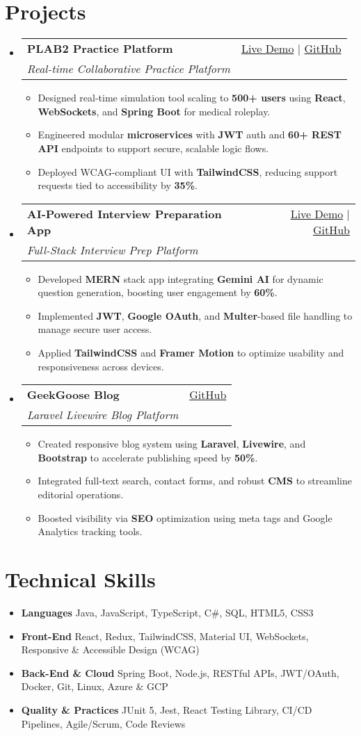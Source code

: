 \documentclass[letterpaper,11pt]{article}
\makeatletter
\newcommand{\resumeItem}[1]{\item\small{#1 \vspace{-2pt}}}
\newcommand{\resumeSubheading}[4]{
  \vspace{-1pt}\item
    \begin{tabular*}{0.97\textwidth}[t]{l@{\extracolsep{\fill}}r}
      \textbf{#1} & #2 \\
      \textit{\small#3} & \textit{\small #4} \\
    \end{tabular*}\vspace{-5pt}
}
\newcommand{\resumeSubHeadingListStart}{\begin{itemize}[leftmargin=*]}
\newcommand{\resumeSubHeadingListEnd}{\end{itemize}}
\newcommand{\resumeItemListStart}{\begin{itemize}}
\newcommand{\resumeItemListEnd}{\end{itemize}\vspace{-5pt}}
\makeatother
\begin{document}
\section{Projects}
  \resumeSubHeadingListStart
    \resumeSubheading
      {\textbf{PLAB2 Practice Platform}}{\href{https://plab2practice.com}{Live Demo} | \href{https://github.com/altansaid/plab2projectnew}{GitHub}}
      {Real-time Collaborative Practice Platform}{}
      \resumeItemListStart
        \resumeItem{Designed real-time simulation tool scaling to \textbf{500+ users} using \textbf{React}, \textbf{WebSockets}, and \textbf{Spring Boot} for medical roleplay.}
        \resumeItem{Engineered modular \textbf{microservices} with \textbf{JWT} auth and \textbf{60+ REST API} endpoints to support secure, scalable logic flows.}
        \resumeItem{Deployed WCAG-compliant UI with \textbf{TailwindCSS}, reducing support requests tied to accessibility by \textbf{35\%}.}
      \resumeItemListEnd

    \resumeSubheading
      {\textbf{AI-Powered Interview Preparation App}}{\href{https://interviewcoach-ai.vercel.app}{Live Demo} | \href{https://github.com/altansaid/interviewcoach-ai}{GitHub}}
      {Full-Stack Interview Prep Platform}{}
      \resumeItemListStart
        \resumeItem{Developed \textbf{MERN} stack app integrating \textbf{Gemini AI} for dynamic question generation, boosting user engagement by \textbf{60\%}.}
        \resumeItem{Implemented \textbf{JWT}, \textbf{Google OAuth}, and \textbf{Multer}-based file handling to manage secure user access.}
        \resumeItem{Applied \textbf{TailwindCSS} and \textbf{Framer Motion} to optimize usability and responsiveness across devices.}
      \resumeItemListEnd

    \resumeSubheading
      {\textbf{GeekGoose Blog}}{\href{https://github.com/altansaid/geekgoose}{GitHub}}
      {Laravel Livewire Blog Platform}{}
      \resumeItemListStart
        \resumeItem{Created responsive blog system using \textbf{Laravel}, \textbf{Livewire}, and \textbf{Bootstrap} to accelerate publishing speed by \textbf{50\%}.}
        \resumeItem{Integrated full-text search, contact forms, and robust \textbf{CMS} to streamline editorial operations.}
        \resumeItem{Boosted visibility via \textbf{SEO} optimization using meta tags and Google Analytics tracking tools.}
      \resumeItemListEnd
  \resumeSubHeadingListEnd

\section{Technical Skills}
  \resumeItemListStart
    \resumeItem{\textbf{Languages}}{Java, JavaScript, TypeScript, C\#, SQL, HTML5, CSS3}
    \resumeItem{\textbf{Front-End}}{React, Redux, TailwindCSS, Material UI, WebSockets, Responsive \& Accessible Design (WCAG)}
    \resumeItem{\textbf{Back-End \& Cloud}}{Spring Boot, Node.js, RESTful APIs, JWT/OAuth, Docker, Git, Linux, Azure \& GCP}
    \resumeItem{\textbf{Quality \& Practices}}{JUnit 5, Jest, React Testing Library, CI/CD Pipelines, Agile/Scrum, Code Reviews}
  \resumeItemListEnd
\end{document}
